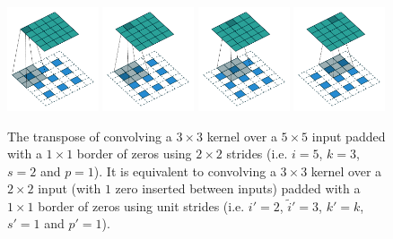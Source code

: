 \documentclass{report}
\begin{document}
\begin{figure}[p]
    \centering
    \includegraphics[width=0.24\textwidth]{pdf/padding_strides_transposed_00.pdf}
    \includegraphics[width=0.24\textwidth]{pdf/padding_strides_transposed_01.pdf}
    \includegraphics[width=0.24\textwidth]{pdf/padding_strides_transposed_02.pdf}
    \includegraphics[width=0.24\textwidth]{pdf/padding_strides_transposed_03.pdf}
    \caption{\label{fig:padding_strides_transposed} The transpose of convolving
        a $3 \times 3$ kernel over a $5 \times 5$ input padded with a $1 \times
        1$ border of zeros using $2 \times 2$ strides (i.e. $i = 5$, $k = 3$, $s
        = 2$ and $p = 1$). It is equivalent to convolving a $3 \times 3$ kernel
        over a $2 \times 2$ input (with $1$ zero inserted between inputs) padded
        with a $1 \times 1$ border of zeros using unit strides (i.e. $i' = 2$,
        $\tilde{i}' = 3$, $k' = k$, $s' = 1$ and $p' = 1$).}
\end{figure}
\end{document}

